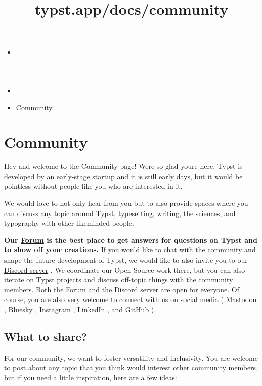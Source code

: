 \title{typst.app/docs/community}

\begin{itemize}
\tightlist
\item
  \href{/docs}{}
\item
  
\item
  \href{/docs/community/}{Community}
\end{itemize}

\section{Community}\label{community}

Hey and welcome to the Community page! We\textquotesingle re so glad
you\textquotesingle re here. Typst is developed by an early-stage
startup and it is still early days, but it would be pointless without
people like you who are interested in it.

We would love to not only hear from you but to also provide spaces where
you can discuss any topic around Typst, typesetting, writing, the
sciences, and typography with other likeminded people.

\textbf{Our \href{https://forum.typst.app/}{Forum} is the best place to
get answers for questions on Typst and to show off your creations.} If
you would like to chat with the community and shape the future
development of Typst, we would like to also invite you to our
\href{https://discord.gg/2uDybryKPe}{Discord server} . We coordinate our
Open-Source work there, but you can also iterate on Typst projects and
discuss off-topic things with the community members. Both the Forum and
the Discord server are open for everyone. Of course, you are also very
welcome to connect with us on social media (
\href{https://mastodon.social/@typst}{Mastodon} ,
\href{https://bsky.app/profile/typst.app}{Bluesky} ,
\href{https://instagram.com/typstapp/}{Instagram} ,
\href{https://linkedin.com/company/typst}{LinkedIn} , and
\href{https://github.com/typst}{GitHub} ).

\subsection{What to share?}\label{what-to-share}

For our community, we want to foster versatility and inclusivity. You
are welcome to post about any topic that you think would interest other
community members, but if you need a little inspiration, here are a few
ideas:

